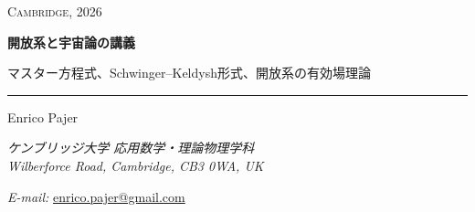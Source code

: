 \documentclass[a4paper,11pt,oneside]{article}
\theoremstyle{definition}
\numberwithin{equation}{section}
\begin{document}
\begin{titlepage}
\thispagestyle{empty}




\vspace*{2.0cm}



\begin{flushright}
{\scshape Cambridge, 2026}
\end{flushright}



\vspace{3.0cm}











{\sffamily\LARGE\bfseries 開放系と宇宙論の講義\par}



\vspace{3mm}



{\large マスター方程式、Schwinger--Keldysh形式、開放系の有効場理論\par}



\vspace{8mm}



\noindent\rule{\textwidth}{0.8pt}



\vspace{8mm}



\noindent
{\sffamily\large Enrico Pajer}



\vspace{3mm}



\noindent
{\itshape
ケンブリッジ大学 応用数学・理論物理学科\\
Wilberforce Road, Cambridge, CB3 0WA, UK
}



\vspace{5mm}



\noindent
{\itshape E-mail:} \href{mailto:enrico.pajer@gmail.com}{enrico.pajer@gmail.com}



\vspace{1cm}




\end{titlepage}
\end{document}
